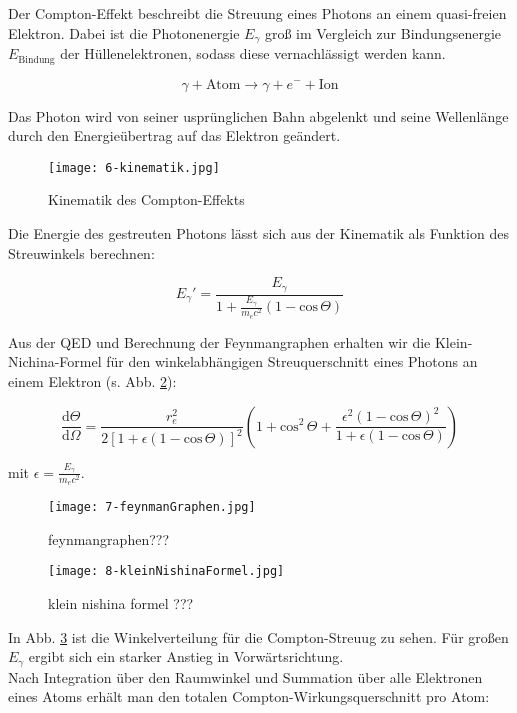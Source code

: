 Der Compton-Effekt beschreibt die Streuung eines Photons an einem quasi-freien Elektron. Dabei ist
die Photonenergie $E_\gamma$ groß im Vergleich zur Bindungsenergie $E_{\text{Bindung}}$ der
Hüllenelektronen, sodass diese vernachlässigt werden kann.

\[ \gamma + \text{Atom} \longrightarrow \gamma + e^- +\text{Ion}\]

Das Photon wird von seiner usprünglichen Bahn abgelenkt und seine Wellenlänge durch den
Energieübertrag auf das Elektron geändert. 

\begin{figure}[H]
	\centering
	\texttt{[image: 6-kinematik.jpg]}
	\caption{Kinematik des Compton-Effekts	}
	\label{}
\end{figure}

Die Energie des gestreuten Photons lässt sich aus der Kinematik als Funktion des Streuwinkels
berechnen:

\[ E_\gamma' = \frac{E_\gamma}{1+ \frac{E_\gamma}{m_ec^2}\left(1-\text{cos}\,\Theta\right)} \]

Aus der QED und Berechnung der Feynmangraphen erhalten wir die Klein-Nichina-Formel für den
winkelabhängigen Streuquerschnitt eines Photons an einem Elektron (s. Abb. \ref{fgraph2}):

\[ \frac{\mathrm{d}\Theta}{\mathrm{d}\Omega} = \frac{r_e^2}{2
\left[1+\epsilon\left(1-\text{cos}\,\Theta \right) \right]^2} \left(1+\text{cos}^2\,\Theta +
\frac{\epsilon^2\left(1-\text{cos}\,\Theta \right)^2}{1+\epsilon\left(1- \text{cos}\,\Theta \right)}
\right)
\]

mit $\epsilon = \frac{E_\gamma}{m_ec^2}$.

\begin{figure}[H]
	\centering
	\texttt{[image: 7-feynmanGraphen.jpg]}
	\caption{feynmangraphen???	}
	\label{fgraph2}
\end{figure}

\begin{figure}[H]
	\centering
	\texttt{[image: 8-kleinNishinaFormel.jpg]}
	\caption{	klein nishina formel ???}
	\label{kleinnishina}
\end{figure}

In Abb. \ref{kleinnishina} ist die Winkelverteilung für die Compton-Streuug zu sehen. Für großen
$E_\gamma$ ergibt sich ein starker Anstieg in Vorwärtsrichtung.
\\
Nach Integration über den Raumwinkel und Summation über alle Elektronen eines Atoms erhält man den
totalen Compton-Wirkungsquerschnitt pro Atom:

